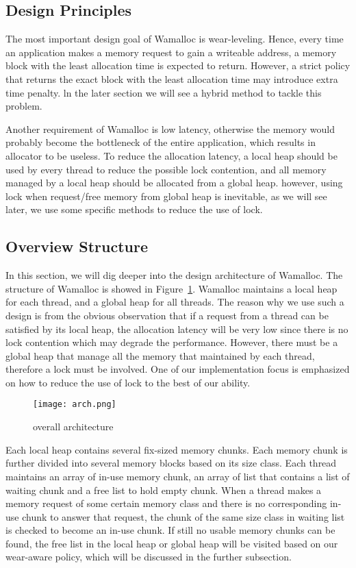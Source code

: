 \documentclass[10pt, conference, compsocconf]{IEEEtran}
\begin{document}
\subsection{Design Principles}

The most important design goal of Wamalloc is wear-leveling. 
Hence, every time an application makes a memory request to gain a writeable address, 
a memory block with the least allocation time is expected to return.
However, a strict policy that returns the exact block with the least allocation time may introduce extra time penalty.
ln the later section we will see a hybrid method to tackle this problem.

Another requirement of Wamalloc is low latency,
otherwise the memory would probably become the bottleneck of the entire application,
which results in allocator to be useless. 
To reduce the allocation latency, a local heap should be used by every thread to reduce the possible lock contention,
and all memory managed by a local heap should be allocated from a global heap.
however, using lock when request/free memory from global heap is inevitable,
as we will see later, we use some specific methods to reduce the use of lock.

\subsection{Overview Structure}

In this section, we will dig deeper into the design architecture of Wamalloc.
The structure of Wamalloc is showed in Figure~\ref{fig:arch}.
Wamalloc maintains a local heap for each thread, and a global heap for all threads.
The reason why we use such a design is from the obvious observation that if a request from a thread can be satisfied by its local heap,
the allocation latency will be very low since there is no lock contention which may degrade the performance.
However, there must be a global heap that manage all the memory that maintained by each thread,
therefore a lock must be involved. One of our implementation focus is emphasized on how to reduce the use of lock to the best of our ability.

\begin{figure}
\centering
\texttt{[image: arch.png]}
\caption{overall architecture}
\label{fig:arch}
\end{figure}

Each local heap contains several fix-sized memory chunks.
Each memory chunk is further divided into several memory blocks based on its size class.
Each thread maintains an array of in-use memory chunk, an array of list that contains a list of waiting chunk and a free list to hold empty chunk.
When a thread makes a memory request of some certain memory class and there is no corresponding in-use chunk to answer that request,
the chunk of the same size class in waiting list is checked to become an in-use chunk. 
If still no usable memory chunks can be found,
the free list in the local heap or global heap will be visited based on our wear-aware policy,
which will be discussed in the further subsection.
\end{document}
